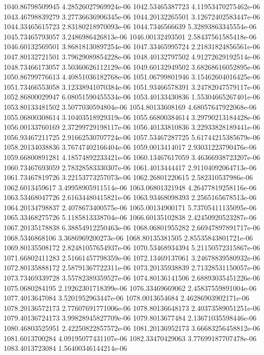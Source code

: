 {1040.86798509945 4.28526027969924e-06
1042.53465387723 4.11953470275462e-06
1043.46798839279 3.27736636906345e-06
1044.20132265501 3.12672402583447e-06
1044.33465615723 2.83180218970093e-06
1044.7346566639 5.32893863345554e-06
1045.73465793057 3.2486986426813e-06
1046.00132493501 2.58437561585418e-06
1046.60132569501 3.86818130897254e-06
1047.33465995724 2.21831824856561e-06
1047.80132721501 3.79629089854228e-06
1048.40132797502 4.91272629192514e-06
1048.73466173057 3.50360626112129e-06
1049.60132949502 3.68268616052895e-06
1050.86799776613 4.40851036182768e-06
1051.06799801946 3.15462604016425e-06
1051.73466553058 3.12338941070384e-06
1051.93466578391 3.24782047579117e-06
1052.86800029947 6.08051590455534e-06
1053.40133430836 1.55304665267401e-06
1053.80133481502 3.5077030594804e-06
1054.80133608169 4.68057647922068e-06
1055.06800308614 3.10403518929319e-06
1055.66800384614 3.29790213184428e-06
1056.00133760169 2.37299729198117e-06
1056.40133810836 3.22933828189441e-06
1056.93467211725 2.91662530707724e-06
1057.53467287725 5.61744215385679e-06
1058.20134038836 3.76747402166404e-06
1059.0013414017 2.93031223790476e-06
1059.66800891281 4.18574892233421e-06
1060.13467617059 3.46366938723207e-06
1060.73467693059 2.78328583330307e-06
1061.4013444417 2.91104092064713e-06
1061.73467819726 3.22153773257073e-06
1062.26801220615 2.582310537986e-06
1062.6013459617 3.49958905911514e-06
1063.06801321948 4.26477819258116e-06
1063.53468047726 2.61634480415821e-06
1063.93468098393 2.2565165678513e-06
1064.20134798837 2.4078673400575e-06
1065.00134900171 5.73705411135095e-06
1065.33468275726 5.1185813338704e-06
1066.60135102838 2.42450920523287e-06
1067.20135178838 6.38854912250463e-06
1068.06801955282 2.66947897891717e-06
1068.5346868106 3.3686969200273e-06
1068.80135381505 2.85535843801721e-06
1069.80135508172 2.82481057654937e-06
1070.53468934394 5.21150572315867e-06
1071.66802411283 2.51661457798359e-06
1072.13469137061 3.24678839580932e-06
1072.80135888172 2.58791367722311e-06
1073.20135938839 2.71328531150057e-06
1073.73469339728 3.55782389359527e-06
1074.80136141506 2.68893035451226e-06
1075.0680284195 2.19262301718399e-06
1076.33469669062 2.45837559891004e-06
1077.4013647084 3.5201952963447e-06
1078.0013654684 2.46286903902171e-06
1078.20136572173 2.77607691771006e-06
1078.80136648173 2.40373589051251e-06
1079.40136724173 3.99828945827709e-06
1079.8013677484 2.13671035598446e-06
1080.46803525951 2.42250822857572e-06
1081.20136952173 3.66683256458812e-06
1081.6013700284 4.09195077431107e-06
1082.33470429063 3.77699187707478e-06
1083.4013723084 1.56400346144214e-06
}
